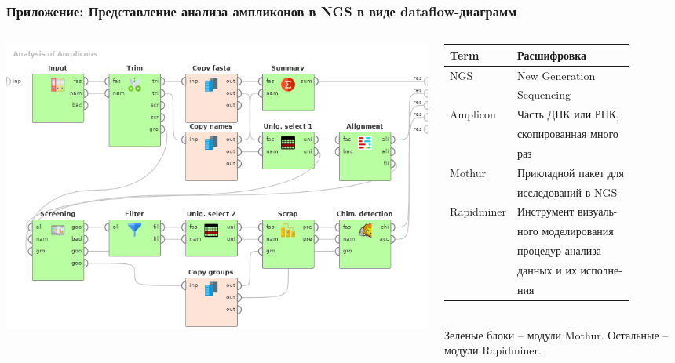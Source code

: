 \documentclass[10pt]{beamer}
\begin{document}
\begin{frame} \frametitle{Приложение: Представление анализа ампликонов в NGS в виде dataflow-диаграмм} \begin{columns} \begin{column}{0.6\textwidth} \begin{raggedright} \includegraphics[width=1\linewidth]{Dataflow-color-en.png} \end{raggedright} \end{column} \begin{column}{0.4\textwidth}\footnotesize \begin{tabular}{ll} Term &Расшифровка\\ \hline

NGS &New Generation\\ &Sequencing\\ Amplicon &Часть ДНК или РНК, \\ &скопированная много \\ & раз\\ Mothur &Прикладной пакет для\\ &исследований в NGS\\ Rapidminer &Инструмент визуаль-\\ &ного моделирования \\ &процедур анализа\\ &данных и их исполне-\\ &ния \end{tabular} ${}$\\[1em] Зеленые блоки -- модули Mothur. Остальные -- модули Rapidminer. \end{column} \end{columns} \end{frame}
\end{document}
